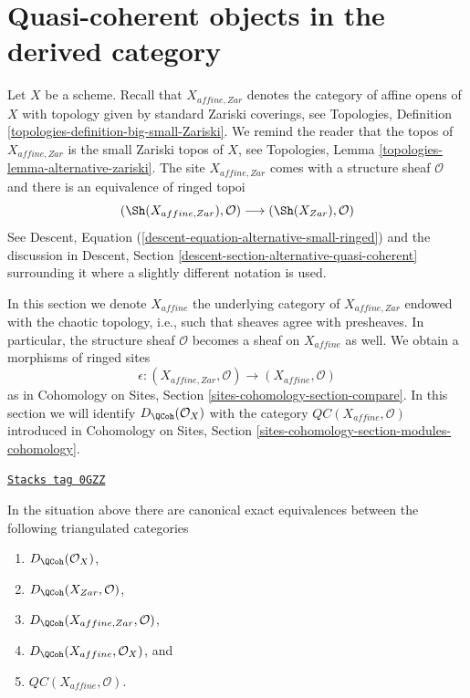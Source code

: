 \section{Quasi-coherent objects in the derived category}
\label{perfect-section-QC}
Let $X$ be a scheme. Recall that $X_{affine, Zar}$
denotes the category of affine opens of $X$ with topology given
by standard Zariski coverings, see
Topologies, Definition \ref{topologies-definition-big-small-Zariski}.
We remind the reader that the topos of $X_{affine, Zar}$
is the small Zariski topos of $X$, see Topologies, Lemma
\ref{topologies-lemma-alternative-zariski}. The site $X_{affine, Zar}$
comes with a structure sheaf $\mathcal{O}$ and there is an
equivalence of ringed topoi
$$
(\Sh(X_{affine, Zar}), \mathcal{O})
\longrightarrow
(\Sh(X_{Zar}), \mathcal{O})
$$
See Descent, Equation (\ref{descent-equation-alternative-small-ringed})
and the discussion in
Descent, Section \ref{descent-section-alternative-quasi-coherent}
surrounding it where a slightly different notation is used.

\medskip\noindent
In this section we denote $X_{affine}$ the underlying category of
$X_{affine, Zar}$ endowed with the chaotic topology, i.e., such that sheaves
agree with presheaves. In particular, the structure sheaf $\mathcal{O}$
becomes a sheaf on $X_{affine}$ as well.
We obtain a morphisms of ringed sites
$$
\epsilon :
(X_{affine, Zar}, \mathcal{O})
\longrightarrow
(X_{affine}, \mathcal{O})
$$
as in Cohomology on Sites, Section \ref{sites-cohomology-section-compare}.
In this section we will identify $D_\QCoh(\mathcal{O}_X)$ with
the category $\mathit{QC}(X_{affine}, \mathcal{O})$ introduced in
Cohomology on Sites, Section \ref{sites-cohomology-section-modules-cohomology}.

\begin{lemma}
\label{perfect-lemma-DQCoh-alternative-small}
\href{https://stacks.math.columbia.edu/tag/0GZZ}{\texttt{Stacks tag 0GZZ}}

In the situation above there are canonical exact equivalences between
the following triangulated categories
\begin{enumerate}
\item $D_\QCoh(\mathcal{O}_X)$,
\item $D_\QCoh(X_{Zar}, \mathcal{O})$,
\item $D_\QCoh(X_{affine, Zar}, \mathcal{O})$,
\item $D_\QCoh(X_{affine}, \mathcal{O}_X)$, and
\item $\mathit{QC}(X_{affine}, \mathcal{O})$.
\end{enumerate}
\end{lemma}

